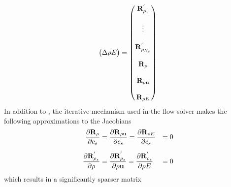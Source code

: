 \begin{equation}
\begin{pmatrix}
    \Delta \rho E
  \end{pmatrix}
  =
  \begin{pmatrix}
    \mathbf R_{\rho_1}^{'}     \\ \\
    \vdots               \\ \\
    \mathbf R_{\rho_{N_s}}^{'} \\ \\
    \mathbf R_{\rho}           \\ \\
    \mathbf R_{\rho \mathbf u}       \\ \\
    \mathbf R_{\rho E}
  \end{pmatrix}
  \label{dc-full-system}
\end{equation}
In addition to , the iterative mechanism used in the flow
solver makes the following approximations to the Jacobians
\begin{equation}
  \begin{aligned}
    \frac{\partial \mathbf R_{\rho}}{\partial c_s} &= \frac{\partial \mathbf R_{\rho \mathbf u}}{\partial c_s} = \frac{\partial \mathbf R_{\rho E}}{\partial c_s} &= 0 \\[6pt]
    \frac{\partial \mathbf R^{'}_{\rho_s}}{\partial \rho} &= \frac{\partial \mathbf R^{'}_{\rho_s}}{\partial \rho \mathbf u} = \frac{\partial \mathbf R^{'}_{\rho_s}}{\partial \rho E} &= 0
  \end{aligned}
  \label{dc-approximations}
\end{equation}
which results in a significantly sparser matrix
